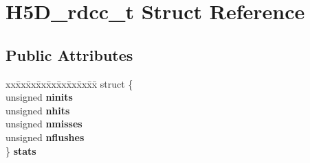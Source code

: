 \hypertarget{struct_h5_d__rdcc__t}{}\section{H5\+D\+\_\+rdcc\+\_\+t Struct Reference}
\label{struct_h5_d__rdcc__t}
\subsection*{Public Attributes}
\begin{DoxyCompactItemize}
\item 
\mbox{\label{struct_h5_d__rdcc__t_a210545eabb8c49100b3e0cfc3e4d8e42}} 
\begin{tabbing}
xx\=xx\=xx\=xx\=xx\=xx\=xx\=xx\=xx\=\kill
struct \{\\
\>unsigned {\bfseries ninits}\\
\>unsigned {\bfseries nhits}\\
\>unsigned {\bfseries nmisses}\\
\>unsigned {\bfseries nflushes}\\
\} {\bfseries stats}\\


\end{tabbing}
\end{DoxyCompactItemize}
